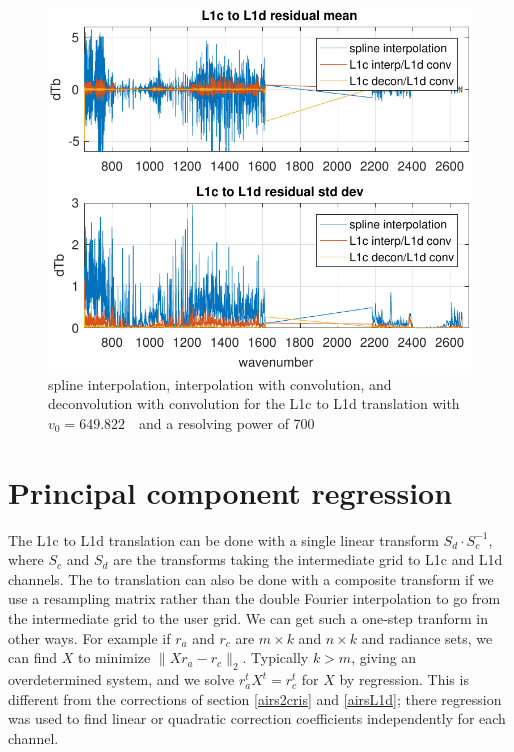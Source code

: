 \documentclass[10pt,twocolumn]{article}  %
\begin{document}
\begin{figure} %
  \centering
  \includegraphics[width=\linewidth]{figures/CtoD_interp_diff.pdf}
  \caption{spline interpolation, interpolation with convolution, 
    and deconvolution with convolution for the {\airs} L1c to L1d
    translation with $v_0=649.822$~\wn\ and a resolving power of 700}
  \label{interpL1d}
\end{figure}

\FloatBarrier
\section{Principal component regression}
\label{dregr}

The {\airs} L1c to L1d translation can be done with a single linear
transform $S_d\cdot S_c^{-1}$, where $S_c$ and $S_d$ are the
transforms taking the intermediate grid to L1c and L1d channels.
The {\airs} to {\cris} translation can also be done with a composite
transform if we use a resampling matrix rather than the double
Fourier interpolation to go from the intermediate grid to the {\cris}
user grid.  We can get such a one-step tranform in other ways.  For
example if $r_a$ and $r_c$ are $m \times k$ and $n \times k$ {\airs}
and {\cris} radiance sets, we can find $X$ to minimize $\|X r_a -
r_c\|_2$.  Typically $k > m$, giving an overdetermined system, and
we solve $r_a^t X^t = r_c^t$ for $X$ by regression.  This is
different from the corrections of section \ref{airs2cris} and
\ref{airsL1d}; there regression was used to find linear or quadratic
correction coefficients independently for each channel.
\end{document}
